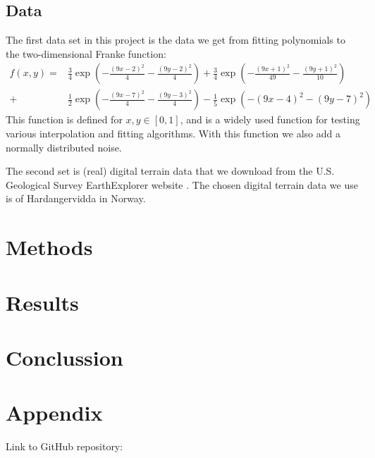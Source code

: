 \documentclass[12pt,a4paper,english]{article}
\begin{document}
\subsection{Data}
The first data set in this project is the data we get from fitting polynomials to the two-dimensional Franke function:
\begin{align}
\label{eq:Franke_func}
f(x,y)=&\frac{3}{4}\exp\left(-\frac{(9x-2)^2}{4}-\frac{(9y-2)^2}{4}\right)+
\frac{3}{4}\exp\left(-\frac{(9x+1)^2}{49}-\frac{(9y+1)^2}{10}\right)\\ 
+& \frac{1}{2}\exp\left(-\frac{(9x-7)^2}{4}-\frac{(9y-3)^2}{4}\right)- \frac{1}{5}\exp\left(-(9x-4)^2-(9y-7)^2\right) \nonumber
\end{align}
This function is defined for $x,y\in[0,1]$, and is a widely used function for testing various interpolation and fitting algorithms. With this function we also add a normally distributed noise.

The second set is (real) digital terrain data that we download from the
U.S. Geological Survey EarthExplorer website \cite{earthexplorer}. The chosen digital terrain data we use is of Hardangervidda in Norway.

\section{Methods}






\section{Results}
\section{Conclussion}

\appendix
\section{Appendix}
\label{sect:appendix}
Link to GitHub repository:\\
\end{document}
